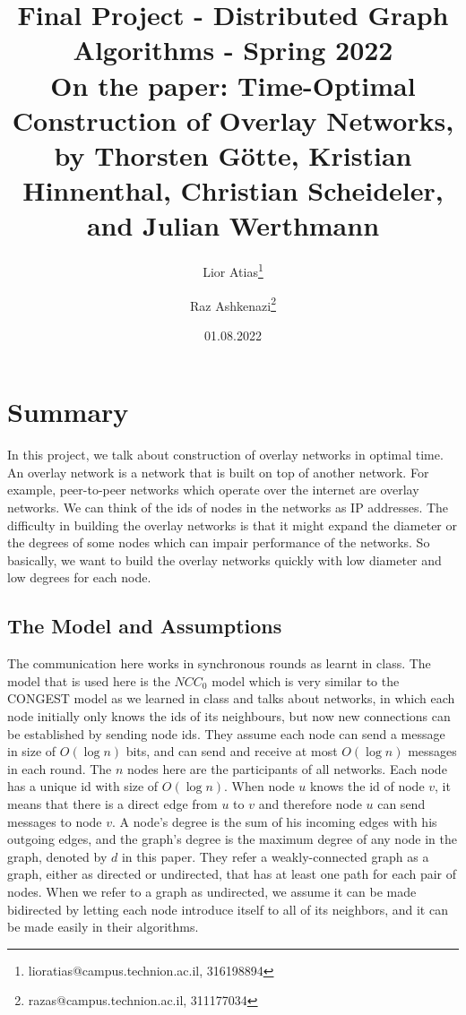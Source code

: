 \documentclass[11pt]{article}
\begin{document}
\title{Final Project - Distributed Graph Algorithms - Spring 2022\\
On the paper: Time-Optimal Construction of Overlay Networks, 
by Thorsten Götte, Kristian Hinnenthal, Christian Scheideler, and Julian Werthmann
}
\author{Lior Atias\footnote{lioratias@campus.technion.ac.il, 316198894} \and Raz Ashkenazi\footnote{razas@campus.technion.ac.il, 311177034}
}
\date{01.08.2022}
	\maketitle
\section{Summary}
In this project, we talk about construction of overlay networks in optimal time. An overlay network is a network that is built on top of another network. For example, peer-to-peer networks which operate over the internet are overlay networks. We can think of the ids of nodes in the networks as IP addresses. The difficulty in building the overlay networks is that it might expand the diameter or the degrees of some nodes which can impair performance of the networks. So basically, we want to build the overlay networks quickly with low diameter and low degrees for each node.

\subsection{The Model and Assumptions}
The communication here works in synchronous rounds as learnt in class. The model that is used here is the $NCC_{0}$ model which is very similar to the CONGEST model as we learned in class and talks about networks, in which each node initially only knows the ids of its neighbours, but now new connections can be established by sending node ids. They assume each node can send a message in size of $O(\log{n})$ bits, and can send and receive at most $O(\log{n})$ messages in each round. The $n$ nodes here are the participants of all networks. Each node has a unique id with size of $O(\log{n})$. When node $u$ knows the id of node $v$, it means that there is a direct edge from $u$ to $v$ and therefore node $u$ can send messages to node $v$. A node's degree is the sum of his incoming edges with his outgoing edges, and the graph's degree is the maximum degree of any node in the graph, denoted by $d$ in this paper. They refer a weakly-connected graph as a graph, either as directed or undirected, that has at least one path for each pair of nodes. When we refer to a graph as undirected, we assume it can be made bidirected by letting each node introduce itself to all of its neighbors, and it can be made easily in their algorithms.
\end{document}
